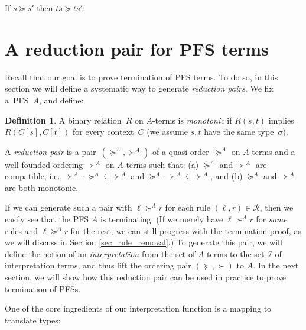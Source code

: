 \documentclass[a4paper,UKenglish,cleveref,autoref,numberwithinsect]{lipics-v2019}
\theoremstyle{definition}
\newtheorem{defn}[theorem]{Definition}
\newcommand{\Rules}{\mathcal{R}}
\newcommand{\Iterms}{\mathcal{I}}
\begin{document}
\begin{corollary}\label{cor_app_wm}
  If $s \succeq s'$ then $t s \succeq t s'$.
\end{corollary}

\section{A reduction pair for PFS terms}\label{sec_reduction_pairs}

Recall that our goal is to prove termination of PFS terms.  To
do so, in this section we will define a systematic way to generate
\emph{reduction pairs}. We fix a~PFS~$A$, and define:

\begin{defn}
  A binary relation~$R$ on $A$-terms is \emph{monotonic} if $R(s, t)$
  implies $R(C[s], C[t])$ for every context~$C$ (we assume $s,t$ have
  the same type~$\sigma$).

  A \emph{reduction pair} is a pair~$(\succeq^A,\succ^A)$ of a
  quasi-order~$\succeq^A$ on $A$-terms and a well-founded
  ordering~$\succ^A$ on $A$-terms such that:
  (a)
  $\succeq^A$ and~$\succ^A$ are compatible, i.e., ${\succ^A}
    \cdot {\succeq^A} \subseteq {\succ^A}$ and ${\succeq^A} \cdot
          {\succ^A} \subseteq {\succ^A}$,
  and (b)
  $\succeq^A$ and~$\succ^A$ are both monotonic.
\end{defn}


If we can generate such a pair with $\ell \succ^A r$ for each
rule $(\ell,r) \in \Rules$, then we easily see that the PFS $A$ is
terminating.  (If we merely have $\ell \succ^A r$ for \emph{some}
rules and $\ell \succeq^A r$ for the rest, we can still progress
with the termination proof, as we will discuss in Section
\ref{sec_rule_removal}.)
To generate this pair, we will define the notion of an
\emph{interpretation} from the set of $A$-terms to the set $\Iterms$ of
interpretation terms, and thus lift the ordering pair $(\succeq,\succ)$
to $A$.
In the next section, we will show how this reduction pair can be used
in practice to prove termination of PFSs.

One of the core ingredients of our interpretation function is a
mapping to translate types:
\end{document}
